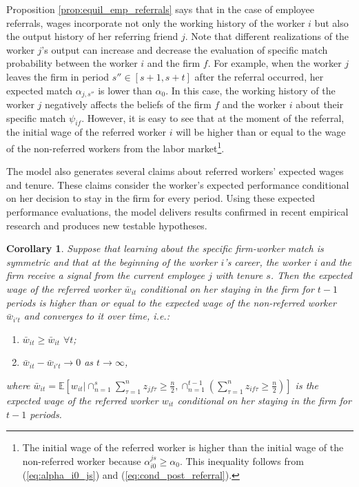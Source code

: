 \documentclass[12pt]{article}
\newtheorem{corollary}[theorem]{Corollary}
\begin{document}
Proposition \ref{prop:equil_emp_referrals} says that in the case of employee referrals, wages incorporate not only the working history of the worker $i$ but also the output history of her referring friend $j$. Note that different realizations of the worker $j$’s output can increase and decrease the evaluation of specific match probability between the worker $i$ and the firm $f$. For example, when the worker $j$ leaves the firm in period $s'' \in [s+1,s+t]$ after the referral occurred, her expected match $\alpha_{j,s''}$ is lower than $\alpha_0$. In this case, the working history of the worker $j$ negatively affects the beliefs of the firm $f$ and the worker $i$ about their specific match $\psi_{if}$. However, it is easy to see that at the moment of the referral, the initial wage of the referred worker $i$ will be higher than or equal to the wage of the non-referred workers from the labor market\footnote{The initial wage of the referred worker is higher than the initial wage of the non-referred worker because $\alpha_{i0}^{js} \geq \alpha_0$. This inequality follows from (\ref{eq:alpha_i0_js}) and (\ref{eq:cond_post_referral}).}.

The model also generates several claims about referred workers' expected wages and tenure. These claims consider the worker's expected performance conditional on her decision to stay in the firm for every period. Using these expected performance evaluations, the model delivers results confirmed in recent empirical research and produces new testable hypotheses.  

\begin{corollary}\label{cor:emp_ref_wage_converge}
Suppose that learning about the specific firm-worker match is symmetric and that at the beginning of the worker $i$’s career, the worker i and the firm receive a signal from the current employee $j$ with tenure $s$. Then the expected wage of the referred worker $\bar{w}_{it}$ conditional on her staying in the firm for $t-1$ periods is higher than or equal to the expected wage of the non-referred worker $\bar{w}_{i't}$ and converges to it over time, i.e.:
\begin{enumerate}[label={\roman*})]
\item $\bar{w}_{it} \geq  \bar{w}_{it}$ $\forall t$;
\item $\bar{w}_{it} -  \bar{w}_{i't} \rightarrow 0$ as $t \rightarrow \infty$,
\end{enumerate}
where $\bar{w}_{it} = \mathbb{E}[w_{it}\vert \cap_{n=1}^{s}\sum_{\tau = 1}^{n}z_{jf\tau}\geq \frac{n}{2}, \cap_{n=1}^{t-1} (\sum_{\tau = 1}^{n} z_{if\tau}\geq \frac{n}{2})]$ is the expected wage of the referred  worker $w_{it}$ conditional on her staying in the firm for $t-1$ periods.
\end{corollary}
\end{document}
